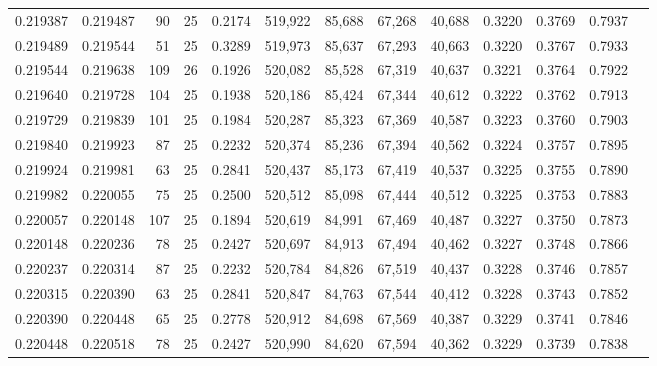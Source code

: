 \begin{tabular}{rrrrrrrrrrrrr}
0.219387 & 0.219487 &    90 &  25 &                                     0.2174 & 519,922 &  85,688 &  67,268 &  40,688 & 0.3220 & 0.3769 & 0.7937 \\
0.219489 & 0.219544 &    51 &  25 &                                     0.3289 & 519,973 &  85,637 &  67,293 &  40,663 & 0.3220 & 0.3767 & 0.7933 \\
0.219544 & 0.219638 &   109 &  26 &                                     0.1926 & 520,082 &  85,528 &  67,319 &  40,637 & 0.3221 & 0.3764 & 0.7922 \\
0.219640 & 0.219728 &   104 &  25 &                                     0.1938 & 520,186 &  85,424 &  67,344 &  40,612 & 0.3222 & 0.3762 & 0.7913 \\
0.219729 & 0.219839 &   101 &  25 &                                     0.1984 & 520,287 &  85,323 &  67,369 &  40,587 & 0.3223 & 0.3760 & 0.7903 \\
0.219840 & 0.219923 &    87 &  25 &                                     0.2232 & 520,374 &  85,236 &  67,394 &  40,562 & 0.3224 & 0.3757 & 0.7895 \\
0.219924 & 0.219981 &    63 &  25 &                                     0.2841 & 520,437 &  85,173 &  67,419 &  40,537 & 0.3225 & 0.3755 & 0.7890 \\
0.219982 & 0.220055 &    75 &  25 &                                     0.2500 & 520,512 &  85,098 &  67,444 &  40,512 & 0.3225 & 0.3753 & 0.7883 \\
0.220057 & 0.220148 &   107 &  25 &                                     0.1894 & 520,619 &  84,991 &  67,469 &  40,487 & 0.3227 & 0.3750 & 0.7873 \\
0.220148 & 0.220236 &    78 &  25 &                                     0.2427 & 520,697 &  84,913 &  67,494 &  40,462 & 0.3227 & 0.3748 & 0.7866 \\
0.220237 & 0.220314 &    87 &  25 &                                     0.2232 & 520,784 &  84,826 &  67,519 &  40,437 & 0.3228 & 0.3746 & 0.7857 \\
0.220315 & 0.220390 &    63 &  25 &                                     0.2841 & 520,847 &  84,763 &  67,544 &  40,412 & 0.3228 & 0.3743 & 0.7852 \\
0.220390 & 0.220448 &    65 &  25 &                                     0.2778 & 520,912 &  84,698 &  67,569 &  40,387 & 0.3229 & 0.3741 & 0.7846 \\
0.220448 & 0.220518 &    78 &  25 &                                     0.2427 & 520,990 &  84,620 &  67,594 &  40,362 & 0.3229 & 0.3739 & 0.7838 \\

\end{tabular}
